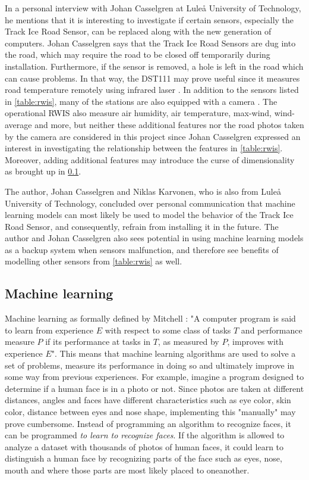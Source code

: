 	In a personal interview with Johan Casselgren at Luleå University of Technology, he mentions that it is interesting to investigate if certain sensors, especially the Track Ice Road Sensor, can be replaced along with the new generation of computers. Johan Casselgren says that the Track Ice Road Sensors are dug into the road, which may require the road to be closed off temporarily during installation. Furthermore, if the sensor is removed, a hole is left in the road which can cause problems. In that way, the DST111 may prove useful since it measures road temperature remotely using infrared laser \cite{WEBSITE:19}. %
In addition to the sensors listed in \ref{table:rwis}, many of the stations are also equipped with a camera \cite{REPORT:2}. The operational RWIS also measure air humidity, air temperature, max-wind, wind-average and more, but neither these additional features nor the road photos taken by the camera are considered in this project since Johan Casselgren expressed an interest in investigating the relationship between the features in \ref{table:rwis}. Moreover, adding additional features may introduce the curse of dimensionality as brought up in \ref{sec:machinelearning}. 

The author, Johan Casselgren and Niklas Karvonen, who is also from Luleå University of Technology, concluded over personal communication that machine learning models can most likely be used to model the behavior of the Track Ice Road Sensor, and consequently, refrain from installing it in the future. The author and Johan Casselgren also sees potential in using machine learning models as a backup system when sensors malfunction, and therefore see benefits of modelling other sensors from \ref{table:rwis} as well. 


	\subsection{Machine learning} \label{sec:machinelearning}
	Machine learning as formally defined by Mitchell \cite{BOOK:2}: 
"A computer program is said to learn from experience $E$ with respect to some class of tasks $T$ and performance measure $P$ if its performance at tasks in $T$, as measured by $P$, improves with experience $E$". This means that machine learning algorithms are used to solve a set of problems, measure its performance in doing so and ultimately improve in some way from previous experiences. For example, imagine a program designed to determine if a human face is in a photo or not. Since photos are taken at different distances, angles and faces have different characteristics such as eye color, skin color, distance between eyes and nose shape, implementing this "manually" may prove cumbersome. Instead of programming an algorithm to recognize faces, it can be programmed  \emph{to learn to recognize faces}. If the algorithm is allowed to analyze a dataset with thousands of photos of human faces, it could learn to distinguish a human face by recognizing parts of the face such as eyes, nose, mouth and where those parts are most likely placed to oneanother.

